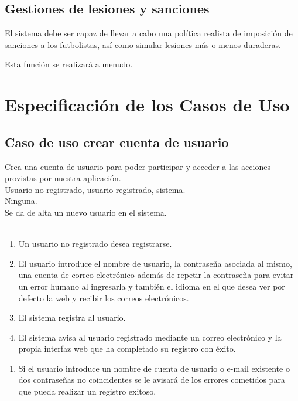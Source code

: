 \subsection*{Gestiones de lesiones y sanciones}
El sistema debe ser capaz de llevar a cabo una política realista de imposición
de sanciones a los futbolistas, así como simular lesiones más o menos duraderas.

Esta función se realizará a menudo.

\section{Especificación de los Casos de Uso}
\subsection*{Caso de uso crear cuenta de usuario}
 Crea una cuenta de usuario para poder
participar y acceder a las acciones provistas por nuestra aplicación.\\
 Usuario no registrado, usuario registrado,
sistema.\\
 Ninguna. \\
 Se da de alta un nuevo usuario en el
sistema. \\
\\
\begin{enumerate}
\item Un usuario no registrado desea registrarse.
\item El usuario introduce el nombre de usuario, la contraseña asociada al
  mismo, una cuenta de correo electrónico además de repetir la contraseña para
  evitar un error humano al ingresarla y también el idioma en el que desea ver
  por defecto la web y recibir los correos electrónicos.
\item El sistema registra al usuario.
\item El sistema avisa al usuario registrado mediante un correo electrónico y la
  propia interfaz web que ha completado su registro con éxito.
\end{enumerate}
\begin{enumerate}
\item Si el usuario introduce un nombre de cuenta de usuario o e-mail existente
  o dos contraseñas no coincidentes se le avisará de los errores cometidos para
  que pueda realizar un registro exitoso.
\end{enumerate}

